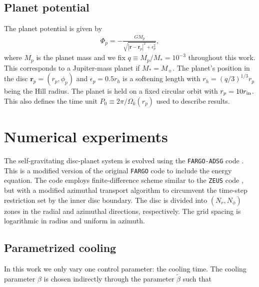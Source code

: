 \subsection{Planet potential}\label{planet_config}
The planet potential is given by 
\begin{align}
\Phi_p = -\frac{GM_p}{\sqrt{|\bm{r} - \bm{r}_p|^2 + \epsilon_p^2}},
\end{align}
where $M_p$ is the planet mass and we fix $q\equiv M_p/M_*=10^{-3}$
throughout this work. This corresponds to a Jupiter-mass planet if $M_*=M_{\sun}$. 
The planet's position in the disc 
 $\bm{r}_p=(r_p,\phi_p)$  and $\epsilon_p=0.5r_h$ is a softening
length with $r_h=(q/3)^{1/3}r_p$ being the Hill radius.  
The planet is held on a fixed circular orbit with $ r_p = 10r_\mathrm{in}$. This also
defines the time unit $P_0\equiv 2\pi/\Omega_k(r_p)$ used to describe results. 


\section{Numerical experiments}\label{method}
The self-gravitating disc-planet system is evolved using the 
\texttt{FARGO-ADSG} code \citep{baruteau08, baruteau08b}. This is a modified version 
of the original \texttt{FARGO} code \citep{masset00a} to include the energy 
equation. The code employs finite-difference scheme similar 
to the \texttt{ZEUS} code \citep{stone92}, but with a modified azimuthal transport 
algorithm to circumvent the time-step restriction set by the inner disc boundary. 
The disc is divided into $(N_r,N_\phi)$ zones in the radial and azimuthal directions, 
respectively. The grid spacing is logarithmic in radius and uniform in azimuth.

\subsection{Parametrized cooling}
In this work we only vary one control parameter: the cooling
time. 
The cooling parameter $\beta$ is chosen indirectly  through the parameter
$\tilde{\beta}$ such that 

